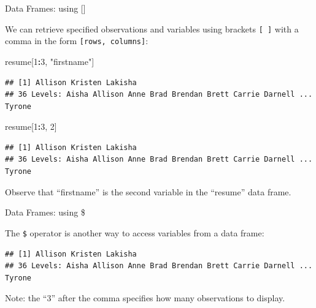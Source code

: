 \documentclass[ignorenonframetext,]{beamer}
\newenvironment{Shaded}{\begin{snugshade}}{\end{snugshade}}
\newcommand{\KeywordTok}[1]{\textcolor[rgb]{0.13,0.29,0.53}{\textbf{#1}}}
\newcommand{\DecValTok}[1]{\textcolor[rgb]{0.00,0.00,0.81}{#1}}
\newcommand{\StringTok}[1]{\textcolor[rgb]{0.31,0.60,0.02}{#1}}
\newcommand{\OperatorTok}[1]{\textcolor[rgb]{0.81,0.36,0.00}{\textbf{#1}}}
\newcommand{\NormalTok}[1]{#1}
\begin{document}
\begin{frame}[fragile]{Data Frames: using {[}{]}}

We can retrieve specified observations and variables using brackets
\texttt{{[}\ {]}} with a comma in the form
\texttt{{[}rows,\ columns{]}}:

\begin{Shaded}
\begin{Highlighting}[]
\NormalTok{resume[}\DecValTok{1}\OperatorTok{:}\DecValTok{3}\NormalTok{, }\StringTok{"firstname"}\NormalTok{]}
\end{Highlighting}
\end{Shaded}

\begin{verbatim}
## [1] Allison Kristen Lakisha
## 36 Levels: Aisha Allison Anne Brad Brendan Brett Carrie Darnell ... Tyrone
\end{verbatim}

\begin{Shaded}
\begin{Highlighting}[]
\NormalTok{resume[}\DecValTok{1}\OperatorTok{:}\DecValTok{3}\NormalTok{, }\DecValTok{2}\NormalTok{]}
\end{Highlighting}
\end{Shaded}

\begin{verbatim}
## [1] Allison Kristen Lakisha
## 36 Levels: Aisha Allison Anne Brad Brendan Brett Carrie Darnell ... Tyrone
\end{verbatim}

Observe that ``firstname'' is the second variable in the ``resume'' data
frame.

\end{frame}

\begin{frame}[fragile]{Data Frames: using \$}

The \texttt{\$} operator is another way to access variables from a data
frame:

\begin{Shaded}
\end{Shaded}

\begin{verbatim}
## [1] Allison Kristen Lakisha
## 36 Levels: Aisha Allison Anne Brad Brendan Brett Carrie Darnell ... Tyrone
\end{verbatim}

Note: the ``3'' after the comma specifies how many observations to
display.

\end{frame}
\end{document}
